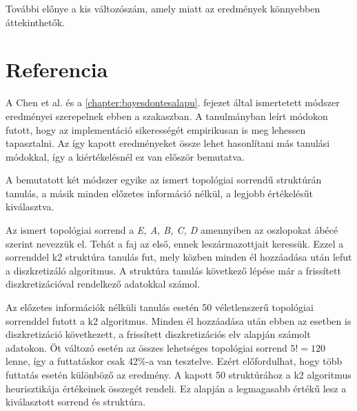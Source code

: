 További előnye a kis változószám, amely miatt az eredmények könnyebben áttekinthetők.

\section{Referencia}
A Chen et al. \cite{chen2017learning} és a \ref{chapter:bayesdontesalapu}. fejezet által ismertetett módszer eredményei szerepelnek ebben a szakaszban. A tanulmányban leírt módokon futott, hogy az implementáció sikerességét empirikusan is meg lehessen tapasztalni. Az így kapott eredményeket össze lehet hasonlítani más tanulási módokkal, így a kiértékelésnél ez van először bemutatva.

A bemutatott két módszer egyike az ismert topológiai sorrendű struktúrán tanulás, a másik minden előzetes információ nélkül, a legjobb értékelésűt kiválasztva.

Az ismert topológiai sorrend a \emph{E, A, B, C, D} amennyiben az oszlopokat ábécé szerint nevezzük el. Tehát a faj az első, ennek leszármazottjait keressük. Ezzel a sorrenddel k2 struktúra tanulás fut, mely közben minden él hozzáadása után lefut a diszkretizáló algoritmus. A struktúra tanulás következő lépése már a frissített diszkretizációval rendelkező adatokkal számol.

Az előzetes információk nélküli tanulás esetén 50 véletlenszerű topológiai sorrenddel futott a k2 algoritmus. Minden él hozzáadása után ebben az esetben is diszkretizáció következett, a frissített diszkretizációs elv alapján számolt adatokon. Öt változó esetén az összes lehetséges topológiai sorrend $5! = 120$ lenne, így a futtatáskor csak 42\%-a van tesztelve. Ezért előfordulhat, hogy több futtatás esetén különböző az eredmény. A kapott 50 struktúrához a k2 algoritmus heurisztikája értékeinek összegét rendeli. Ez alapján a legmagasabb értékű lesz a kiválasztott sorrend és struktúra.